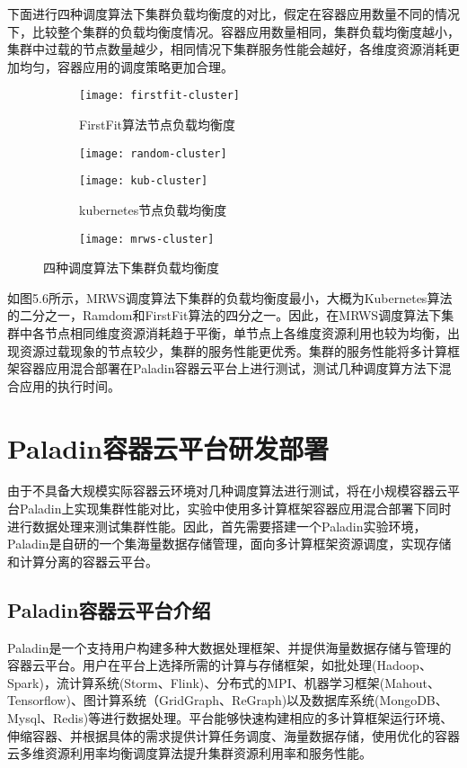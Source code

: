 下面进行四种调度算法下集群负载均衡度的对比，假定在容器应用数量不同的情况下，比较整个集群的负载均衡度情况。容器应用数量相同，集群负载均衡度越小，集群中过载的节点数量越少，相同情况下集群服务性能会越好，各维度资源消耗更加均匀，容器应用的调度策略更加合理。

\begin{figure}[H]
	\centering%
	\begin{subfigure}{7cm}
		\texttt{[image: firstfit-cluster]}
		\caption{FirstFit算法节点负载均衡度}
	\end{subfigure}%
	\hspace{0.5cm}%
	\begin{subfigure}{7cm}
		\texttt{[image: random-cluster]}
	\end{subfigure}
	\begin{subfigure}{7cm}
		\texttt{[image: kub-cluster]}
		\caption{kubernetes节点负载均衡度}
	\end{subfigure}%
	\hspace{0.5cm}%
	\begin{subfigure}{7cm}
		\texttt{[image: mrws-cluster]}
	\end{subfigure}
	\caption{四种调度算法下集群负载均衡度}	
\end{figure}

如图5.6所示，MRWS调度算法下集群的负载均衡度最小，大概为Kubernetes算法的二分之一，Ramdom和FirstFit算法的四分之一。因此，在MRWS调度算法下集群中各节点相同维度资源消耗趋于平衡，单节点上各维度资源利用也较为均衡，出现资源过载现象的节点较少，集群的服务性能更优秀。集群的服务性能将多计算框架容器应用混合部署在Paladin容器云平台上进行测试，测试几种调度算方法下混合应用的执行时间。

\section{Paladin容器云平台研发部署}
由于不具备大规模实际容器云环境对几种调度算法进行测试，将在小规模容器云平台Paladin上实现集群性能对比，实验中使用多计算框架容器应用混合部署下同时进行数据处理来测试集群性能。因此，首先需要搭建一个Paladin实验环境，Paladin是自研的一个集海量数据存储管理，面向多计算框架资源调度，实现存储和计算分离的容器云平台。

\subsection{Paladin容器云平台介绍}
Paladin是一个支持用户构建多种大数据处理框架、并提供海量数据存储与管理的容器云平台。用户在平台上选择所需的计算与存储框架，如批处理(Hadoop、Spark)，流计算系统(Storm、Flink)、分布式的MPI、机器学习框架(Mahout、Tensorflow)、图计算系统（GridGraph、ReGraph)以及数据库系统(MongoDB、Mysql、Redis)等进行数据处理。平台能够快速构建相应的多计算框架运行环境、伸缩容器、并根据具体的需求提供计算任务调度、海量数据存储，使用优化的容器云多维资源利用率均衡调度算法提升集群资源利用率和服务性能。

